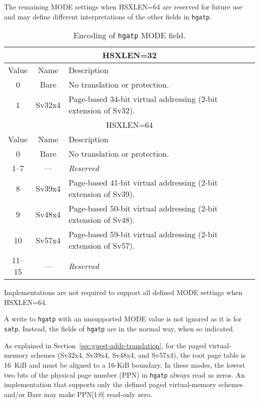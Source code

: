 The remaining MODE settings when HSXLEN=64 are reserved for future use and may define
different interpretations of the other fields in {\tt hgatp}.

\begin{table}[h]
\begin{center}
\begin{tabular}{|c|c|l|}
\hline
\multicolumn{3}{|c|}{HSXLEN=32} \\
\hline
Value  & Name & Description \\
\hline
0      & Bare   & No translation or protection. \\
1      & Sv32x4 & Page-based 34-bit virtual addressing (2-bit extension of Sv32). \\
\hline \hline
\multicolumn{3}{|c|}{HSXLEN=64} \\
\hline
Value  & Name & Description \\
\hline
0      & Bare   & No translation or protection. \\
1--7   & ---    & {\em Reserved} \\
8      & Sv39x4 & Page-based 41-bit virtual addressing (2-bit extension of Sv39). \\
9      & Sv48x4 & Page-based 50-bit virtual addressing (2-bit extension of Sv48). \\
10     & Sv57x4 & Page-based 59-bit virtual addressing (2-bit extension of Sv57). \\
11--15 & ---    & {\em Reserved} \\
\hline
\end{tabular}
\end{center}
\caption{Encoding of {\tt hgatp} MODE field.}
\label{tab:hgatp-mode}
\end{table}

Implementations are not required to support all defined MODE
settings when HSXLEN=64.

A write to {\tt hgatp} with an unsupported MODE value is not ignored as it is
for {\tt satp}.
Instead, the fields of {\tt hgatp} are {\warl} in the normal way, when so
indicated.

As explained in Section~\ref{sec:guest-addr-translation}, for the paged
virtual-memory schemes (Sv32x4, Sv39x4, Sv48x4, and Sv57x4), the root page table is
16~KiB and must be aligned to a 16-KiB boundary.
In these modes, the lowest two bits of the physical page number (PPN) in
{\tt hgatp} always read as zeros.
An implementation that supports only the defined paged virtual-memory schemes
and/or Bare may make PPN[1:0] read-only zero.

